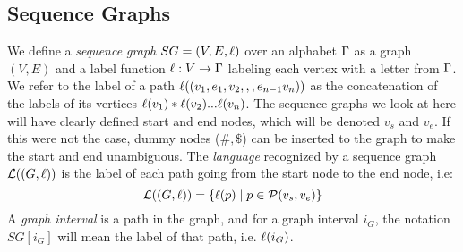 \subsection{Sequence Graphs}
We define a \emph{sequence graph} $SG = (V, E, \ell)$ over an alphabet $\Gamma$ as a graph $(V, E)$ and a label function $\ell: V \rightarrow \Gamma$ labeling each vertex with a letter from $\Gamma$.
We refer to the label of a path $\ell((v_1, e_1, v_2,,,e_{n-1}v_n))$ as the concatenation of the labels of its vertices $\ell(v_1)*\ell(v_2) ... \ell(v_n)$.
The sequence graphs we look at here will have clearly defined start and end nodes, which will be denoted $v_s$ and $v_e$. If this were not the case, dummy nodes ($\#, \$$) can be inserted to the graph to make the start and end unambiguous.
The \emph{language} recognized by a sequence graph $\mathcal{L}((G, \ell))$ is the label of each path going from the start node to the end node, i.e:
\[
  \mathcal{L}((G, \ell)) = \left\{ \ell(p) \mid p \in \mathcal{P}(v_s, v_e)\right\}
\]
A \emph{graph interval} is a path in the graph, and for a graph interval $i_G$, the notation  $SG[i_G]$ will mean the label of that path, i.e. $\ell(i_G)$.


